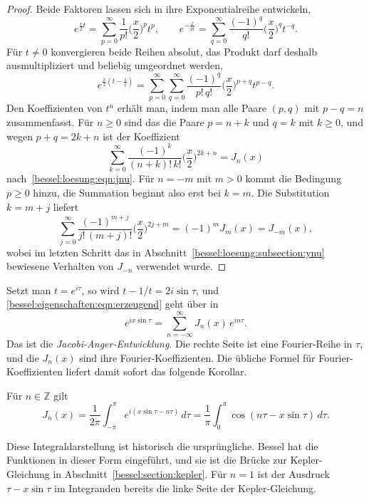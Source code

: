\begin{proof}
Beide Faktoren lassen sich in ihre Exponentialreihe entwickeln,
\[
e^{\frac{x}{2}t}
=
\sum_{p=0}^\infty
\frac{1}{p!}
\biggl(\frac{x}{2}\biggr)^{p} t^{p},
\qquad
e^{-\frac{x}{2t}}
=
\sum_{q=0}^\infty
\frac{(-1)^q}{q!}
\biggl(\frac{x}{2}\biggr)^{q} t^{-q}.
\]
Für $t\ne 0$ konvergieren beide Reihen absolut, das Produkt darf deshalb ausmultipliziert und beliebig umgeordnet werden,
\[
e^{\frac{x}{2}\left(t-\frac{1}{t}\right)}
=
\sum_{p=0}^\infty
\sum_{q=0}^\infty
\frac{(-1)^q}{p!\,q!}
\biggl(\frac{x}{2}\biggr)^{p+q}
t^{p-q}.
\]
Den Koeffizienten von $t^n$ erhält man, indem man alle Paare $(p,q)$ mit $p-q=n$ zusammenfasst.
Für $n\ge 0$ sind das die Paare $p=n+k$ und $q=k$ mit $k\ge 0$, und wegen $p+q=2k+n$ ist der Koeffizient
\[
\sum_{k=0}^\infty
\frac{(-1)^k}{(n+k)!\,k!}
\biggl(\frac{x}{2}\biggr)^{2k+n}
=
J_n(x)
\]
nach~\eqref{bessel:loesung:eqn:jnu}.
Für $n=-m$ mit $m>0$ kommt die Bedingung $p\ge 0$ hinzu, die Summation beginnt also erst bei $k=m$.
Die Substitution $k=m+j$ liefert
\[
\sum_{j=0}^\infty
\frac{(-1)^{m+j}}{j!\,(m+j)!}
\biggl(\frac{x}{2}\biggr)^{2j+m}
=
(-1)^m J_m(x)
=
J_{-m}(x),
\]
wobei im letzten Schritt das in Abschnitt~\ref{bessel:loesung:subsection:ynu} bewiesene Verhalten von $J_{-n}$ verwendet wurde.
\end{proof}

Setzt man $t=e^{i\tau}$, so wird $t-1/t = 2i\sin\tau$, und \eqref{bessel:eigenschaften:eqn:erzeugend} geht über in
\begin{equation}
e^{ix\sin\tau}
=
\sum_{n=-\infty}^{\infty}
J_n(x)\, e^{in\tau}.
\label{bessel:eigenschaften:eqn:jacobianger}
\end{equation}
Das ist die \emph{Jacobi-Anger-Entwicklung}.
%
Die rechte Seite ist eine Fourier-Reihe in $\tau$, und die $J_n(x)$ sind ihre Fourier-Koeffizienten.
Die übliche Formel für Fourier-Koeffizienten liefert damit sofort das folgende Korollar.

\begin{korollar}
\label{bessel:eigenschaften:korollar:integral}
Für $n\in\mathbb{Z}$ gilt
\begin{equation}
J_n(x)
=
\frac{1}{2\pi}
\int_{-\pi}^{\pi}
e^{i(x\sin\tau - n\tau)}\,d\tau
=
\frac{1}{\pi}
\int_0^{\pi}
\cos(n\tau - x\sin\tau)\,d\tau.
\label{bessel:eigenschaften:eqn:integral}
\end{equation}
\end{korollar}

Diese Integraldarstellung ist historisch die ursprüngliche.
%
%
Bessel hat die Funktionen in dieser Form eingeführt, und sie ist die Brücke zur Kepler-Gleichung in Abschnitt~\ref{bessel:section:kepler}.
Für $n=1$ ist der Ausdruck $\tau - x\sin\tau$ im Integranden bereits die linke Seite der Kepler-Gleichung.

